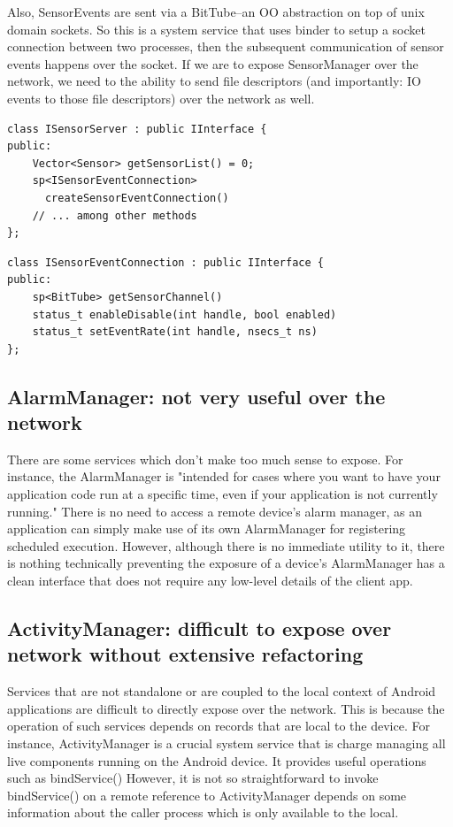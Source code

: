 \documentclass[prodmode]{acmlarge}
\begin{document}
Also, SensorEvents are sent via a BitTube--an OO abstraction on top of unix domain sockets. So this is a system service that uses binder to setup a socket connection between two processes, then the subsequent communication of sensor events happens over the socket. If we are to expose SensorManager over the network, we need to the ability to send file descriptors (and importantly: IO events to those file descriptors) over the network as well.

\begin{Verbatim}[samepage=true]
class ISensorServer : public IInterface {
public:
    Vector<Sensor> getSensorList() = 0;
    sp<ISensorEventConnection>
      createSensorEventConnection()
    // ... among other methods
};
\end{Verbatim}

\begin{Verbatim}[samepage=true]
class ISensorEventConnection : public IInterface {
public:
    sp<BitTube> getSensorChannel()
    status_t enableDisable(int handle, bool enabled)
    status_t setEventRate(int handle, nsecs_t ns)
};
\end{Verbatim}

\subsection{AlarmManager: not very useful over the network}
There are some services which don't make too much sense to expose. For instance, the AlarmManager is "intended for cases where you want to have your application code run at a specific time, even if your application is not currently running." There is no need to access a remote device's alarm manager, as an application can simply make use of its own AlarmManager for registering scheduled execution. However, although there is no immediate utility to it, there is nothing technically preventing the exposure of a device's AlarmManager has a clean interface that does not require any low-level details of the client app.

\subsection{ActivityManager: difficult to expose over network without extensive refactoring}
Services that are not standalone or are coupled to the local context of Android applications are difficult to directly expose over the network. This is because the operation of such services depends on records that are local to the device. For instance, ActivityManager is a crucial system service that is charge managing all live components running on the Android device. It provides useful operations such as bindService()  However, it is not so straightforward to invoke bindService() on a remote reference to ActivityManager depends on some information about the caller process which is only available to the local.
\end{document}
